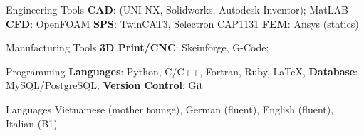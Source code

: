 

\begin{cvskills}

  \cvskill
    {Engineering Tools} %
    {\textbf{CAD}: (UNI NX, Solidworks, Autodesk Inventor); MatLAB
    \newline \textbf{CFD}: OpenFOAM
    \newline \textbf{SPS}: TwinCAT3, Selectron CAP1131
	\newline \textbf{FEM}: Ansys (statics)} %

  \cvskill
    {Manufacturing Tools} %
    {\textbf{3D Print/CNC}: Skeinforge, G-Code;} %

  \cvskill
    {Programming} %
    {\textbf{Languages}: Python, C/C++, Fortran, Ruby, LaTeX, 
    	\newline \textbf{Database}: MySQL/PostgreSQL,
    	\newline \textbf{Version Control}: Git} %


  \cvskill
    {Languages} %
    {Vietnamese (mother tounge), German (fluent), English (fluent), Italian (B1)} %

\end{cvskills}
